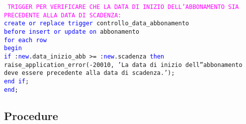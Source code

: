 \documentclass{article}
\begin{document}
    \newpage
    \begin{flushleft}
        \texttt{
        \textcolor{magenta}{TRIGGER PER VERIFICARE CHE LA DATA DI INIZIO DELL'ABBONAMENTO SIA PRECEDENTE \hspace*{0.5em}ALLA DATA DI SCADENZA:} \\
        \hspace*{2em} \textcolor{blue}{create or replace trigger} controllo\_data\_abbonamento \\
        \hspace*{2em} \textcolor{blue}{before insert or update on} abbonamento \\
        \hspace*{2em} \textcolor{blue}{for each row} \\
        \hspace*{2em} \textcolor{blue}{begin} \\
        \hspace*{4.4em}\textcolor{blue}{if} :\textcolor{blue}{new}.data\_inizio\_abb >= :\textcolor{blue}{new}.scadenza \textcolor{blue}{then} \hspace*{4.4em}raise\_application\_error(-20010, 'La data di inizio dell''abbonamento deve  \hspace*{4.4em}essere precedente alla data di scadenza.');\\
        \hspace*{4em} \textcolor{blue}{end if}; \\
        \hspace*{2em} \textcolor{blue}{end}; \\}
    \end{flushleft}

\subsection{Procedure}
\end{document}
